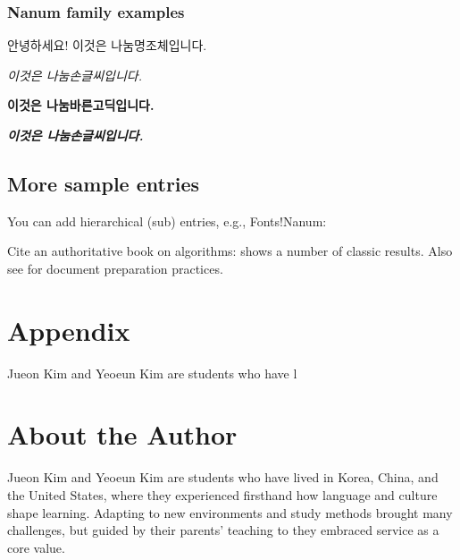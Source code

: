\documentclass[12pt]{book}
\begin{document}
  \subsection{Nanum family examples}
  안녕하세요! 이것은 나눔명조체입니다.

  \textit{이것은 나눔손글씨입니다.}

  \textbf{이것은 나눔바른고딕입니다.}

  \textbf{\textit{이것은 나눔손글씨입니다.}}

  \section{More sample entries}
  You can add hierarchical (sub) entries, e.g., Fonts!Nanum:


  Cite an authoritative book on algorithms: \textcite{noauthor_help_2010} shows a number of classic results.
  Also see \parencite{kim_ssat-sat_2003} for document preparation practices.

  











  \backmatter
  \chapter*{Appendix}
  Jueon Kim and Yeoeun Kim are students who have l


  \clearpage
  \printbibliography[
    heading=bibintoc,   %
    title={References}
  ]
  \clearpage
  \printindex                  %


  \chapter*{About the Author}
  Jueon Kim and Yeoeun Kim are students who have lived in Korea, China, and the 
  United States, where they experienced firsthand how language and culture shape 
  learning. Adapting to new environments and study methods brought many challenges, 
  but guided by their parents' teaching to  
  they embraced service as a core value.
  
\end{document}
